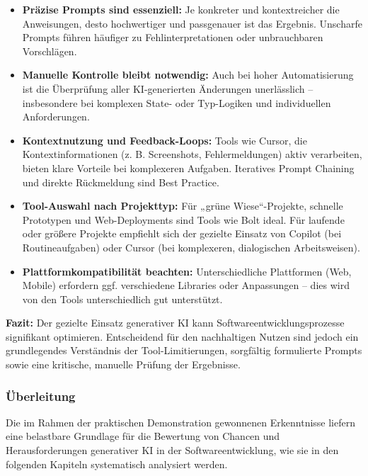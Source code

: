 \begin{itemize}
    \item \textbf{Präzise Prompts sind essenziell:} Je konkreter und kontextreicher die Anweisungen, desto hochwertiger und passgenauer ist das Ergebnis. Unscharfe Prompts führen häufiger zu Fehlinterpretationen oder unbrauchbaren Vorschlägen.
    \item \textbf{Manuelle Kontrolle bleibt notwendig:} Auch bei hoher Automatisierung ist die Überprüfung aller KI-generierten Änderungen unerlässlich – insbesondere bei komplexen State- oder Typ-Logiken und individuellen Anforderungen.
    \item \textbf{Kontextnutzung und Feedback-Loops:} Tools wie Cursor, die Kontextinformationen (z. B. Screenshots, Fehlermeldungen) aktiv verarbeiten, bieten klare Vorteile bei komplexeren Aufgaben. Iteratives Prompt Chaining und direkte Rückmeldung sind Best Practice.
    \item \textbf{Tool-Auswahl nach Projekttyp:} Für „grüne Wiese“-Projekte, schnelle Prototypen und Web-Deployments sind Tools wie Bolt ideal. Für laufende oder größere Projekte empfiehlt sich der gezielte Einsatz von Copilot (bei Routineaufgaben) oder Cursor (bei komplexeren, dialogischen Arbeitsweisen).
    \item \textbf{Plattformkompatibilität beachten:} Unterschiedliche Plattformen (Web, Mobile) erfordern ggf. verschiedene Libraries oder Anpassungen – dies wird von den Tools unterschiedlich gut unterstützt.
\end{itemize}

\textbf{Fazit:}
Der gezielte Einsatz generativer KI kann Softwareentwicklungsprozesse signifikant optimieren. Entscheidend für den nachhaltigen Nutzen sind jedoch ein grundlegendes Verständnis der Tool-Limitierungen, sorgfältig formulierte Prompts sowie eine kritische, manuelle Prüfung der Ergebnisse.

\subsubsection{Überleitung}
Die im Rahmen der praktischen Demonstration gewonnenen Erkenntnisse liefern
eine belastbare Grundlage für die Bewertung von Chancen und Herausforderungen
generativer KI in der Softwareentwicklung, wie sie in den folgenden Kapiteln
systematisch analysiert werden.


